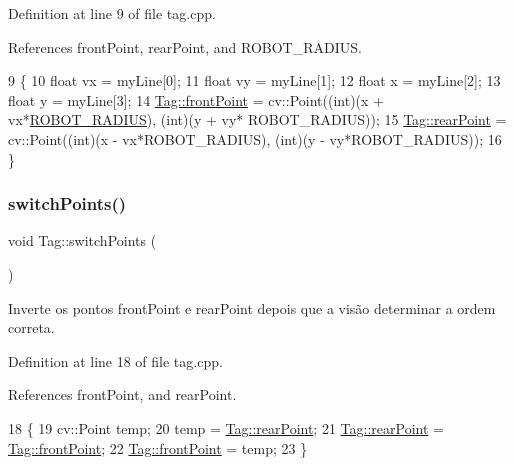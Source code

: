 Definition at line 9 of file tag.\+cpp.



References front\+Point, rear\+Point, and R\+O\+B\+O\+T\+\_\+\+R\+A\+D\+I\+US.


\begin{DoxyCode}
9                                 \{
10     \textcolor{keywordtype}{float} vx = myLine[0];
11     \textcolor{keywordtype}{float} vy = myLine[1];
12     \textcolor{keywordtype}{float} x = myLine[2];
13     \textcolor{keywordtype}{float} y = myLine[3];
14     \hyperlink{class_tag_a7c2bc76740b514cbc77487468535c670}{Tag::frontPoint} = cv::Point((\textcolor{keywordtype}{int})(x + vx*\hyperlink{camcap_8hpp_ab69dd643c61be536f4dc344cf7da0be6}{ROBOT\_RADIUS}), (\textcolor{keywordtype}{int})(y + vy*
      ROBOT\_RADIUS));
15     \hyperlink{class_tag_adfb71b0abef8e25842afa292397b8140}{Tag::rearPoint} = cv::Point((\textcolor{keywordtype}{int})(x - vx*ROBOT\_RADIUS), (\textcolor{keywordtype}{int})(y - vy*ROBOT\_RADIUS));
16 \}
\end{DoxyCode}
\mbox{\label{class_tag_a4db5be8412c2712715aa253ec4cbda96}} 
\subsubsection{\texorpdfstring{switch\+Points()}{switchPoints()}}
{\footnotesize\ttfamily void Tag\+::switch\+Points (\begin{DoxyParamCaption}{ }\end{DoxyParamCaption})}

Inverte os pontos front\+Point e rear\+Point depois que a visão determinar a ordem correta. 

Definition at line 18 of file tag.\+cpp.



References front\+Point, and rear\+Point.


\begin{DoxyCode}
18                        \{
19     cv::Point temp;
20     temp = \hyperlink{class_tag_adfb71b0abef8e25842afa292397b8140}{Tag::rearPoint};
21     \hyperlink{class_tag_adfb71b0abef8e25842afa292397b8140}{Tag::rearPoint} = \hyperlink{class_tag_a7c2bc76740b514cbc77487468535c670}{Tag::frontPoint};
22     \hyperlink{class_tag_a7c2bc76740b514cbc77487468535c670}{Tag::frontPoint} = temp;
23 \}
\end{DoxyCode}


